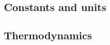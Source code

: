 \documentclass[12pt]{article}
\begin{document}
\raggedcolumns

\begin{multicols*}{2}

\subsection{Constants and units}


\subsection{Thermodynamics}


\end{multicols*}
\end{document}
